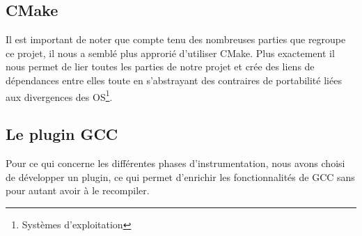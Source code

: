 


\subsection{CMake}

Il est important de noter que compte tenu des nombreuses parties que regroupe ce projet, il nous a semblé plus approrié d'utiliser CMake. Plus exactement il nous permet de lier toutes les parties de notre projet et crée des liens de dépendances entre elles toute en s'abstrayant des contraires de portabilité liées aux divergences des OS\footnote{Systèmes d'exploitation}.

\subsection{Le plugin GCC}

Pour ce qui concerne les différentes phases d'instrumentation, nous avons choisi de développer un plugin, ce qui permet d'enrichir les fonctionnalités de GCC sans pour autant avoir à le recompiler.
